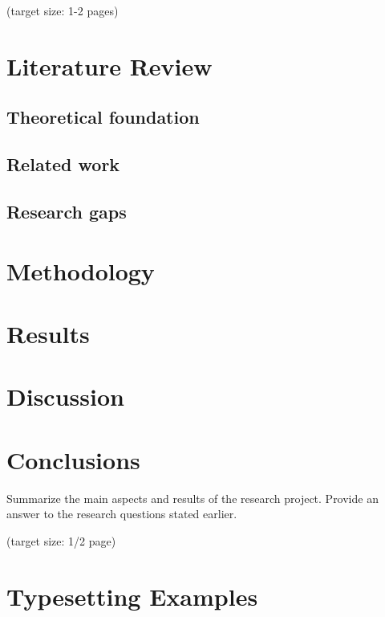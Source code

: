 \documentclass[a4paper,11pt,oneside]{article}
\begin{document}
  (target size: 1-2 pages)

  \section{Literature Review}

  \subsection{Theoretical foundation}

  \subsection{Related work}

  \subsection{Research gaps}




  \section{Methodology}


  \section{Results}

  \section{Discussion}

  \section{Conclusions}

  Summarize the main aspects and results of the research
  project. Provide an answer to the research questions stated earlier.

  (target size: 1/2 page)

  \nocite{JS06}

  \newpage
  \printbibliography

  \clearpage
  \appendix
  \section{Typesetting Examples}
\end{document}
